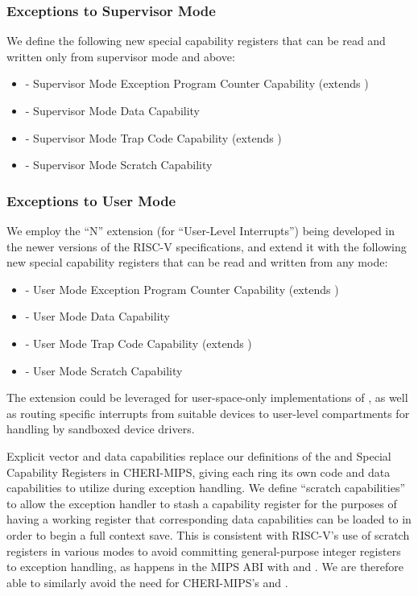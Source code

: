 \subsubsection{Exceptions to Supervisor Mode}

We define the following new special capability registers that can be read and
written only from supervisor mode and above:

\begin{itemize}
\item \SEPCC{} - Supervisor Mode Exception Program Counter Capability (extends
  \sepc{})
\item \STDC{} - Supervisor Mode Data Capability
\item \STCC{} - Supervisor Mode Trap Code Capability (extends
  \stvec{})
\item \SScratchC{} - Supervisor Mode Scratch Capability
\end{itemize}

\subsubsection{Exceptions to User Mode}

We employ the ``N'' extension (for ``User-Level Interrupts'') being developed in
the newer versions of the RISC-V specifications, and extend it with the following
new special capability registers that can be read and written from any mode:

\begin{itemize}
\item \UEPCC{} - User Mode Exception Program Counter Capability (extends
  \uepc{})
\item \UTDC{} - User Mode Data Capability
\item \UTCC{} - User Mode Trap Code Capability (extends \utvec{})
\item \UScratchC{} - User Mode Scratch Capability
\end{itemize}

The extension could be leveraged for user-space-only implementations
of , as well as routing specific interrupts from
suitable devices to user-level compartments for handling by sandboxed
device drivers.

Explicit vector and data capabilities replace our definitions of the \KCC{}
and \KDC{} Special Capability Registers in CHERI-MIPS, giving each ring its
own code and data capabilities to utilize during exception handling.
We define ``scratch capabilities'' to allow the exception handler to stash a
capability register for the purposes of having a working register that
corresponding data capabilities can be loaded to in order to begin a full
context save.
This is consistent with RISC-V's use of scratch registers in various modes to
avoid committing general-purpose integer registers to exception handling, as happens
in the MIPS ABI with  and .
We are therefore able to similarly avoid the need for CHERI-MIPS's \KRC{} and
\KQC{}.

